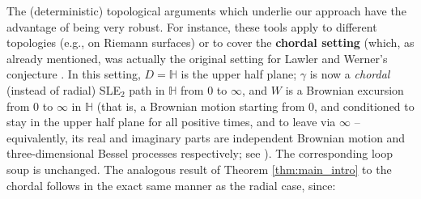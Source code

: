 \documentclass[11pt]{article}
\def\cL{{\mathcal L}}
\begin{document}

The (deterministic) topological arguments which underlie our approach have the advantage of being very robust. For instance, these tools apply to different topologies (e.g., on Riemann surfaces) or to cover the 
\textbf{chordal setting} (which, as already mentioned, was actually the original setting for Lawler and Werner's conjecture \cite{LawlerWerner}. In this setting, $D = \mathbb{H}$ is the upper half plane; $\gamma$ is now a \emph{chordal} (instead of radial) SLE$_2$ path in $\mathbb{H}$ from 0 to $\infty$, and $W$ is a Brownian excursion from 0 to $\infty$ in $\mathbb{H}$ (that is, a Brownian motion starting from 0, and conditioned to stay in the upper half plane for all positive times, and to leave via $\infty$ -- equivalently, its real and imaginary parts are independent Brownian motion and three-dimensional Bessel processes respectively; see \cite{BN}). The corresponding loop soup is unchanged. The analogous result of Theorem \ref{thm:main_intro} to the chordal follows in the exact same manner as the radial case, since:
\end{document}
